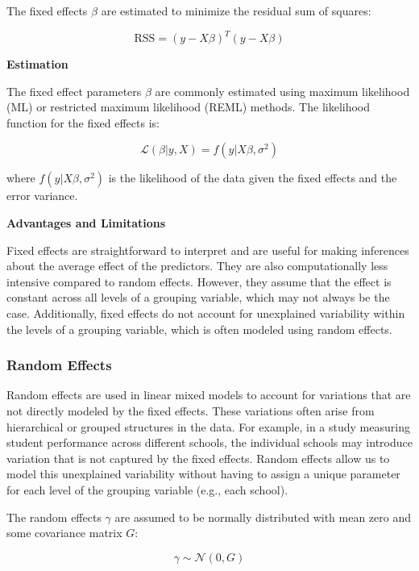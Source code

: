 \documentclass[12pt, twoside,hidelinks]{article}
\theoremstyle{definition}
\numberwithin{equation}{section}
\begin{document}
The fixed effects \( \beta \) are estimated to minimize the residual sum of squares:

\[
\text{RSS} = (y - X\beta)^T(y - X\beta)
\]

\textbf{Estimation}
\newline

The fixed effect parameters \( \beta \) are commonly estimated using maximum likelihood (ML) or restricted maximum likelihood (REML) methods. The likelihood function for the fixed effects is:

\[
\mathcal{L}(\beta | y, X) = f(y | X\beta, \sigma^2)
\]

where \( f(y | X\beta, \sigma^2) \) is the likelihood of the data given the fixed effects and the error variance.
\newline

\textbf{Advantages and Limitations}
\newline

Fixed effects are straightforward to interpret and are useful for making inferences about the average effect of the predictors. They are also computationally less intensive compared to random effects. However, they assume that the effect is constant across all levels of a grouping variable, which may not always be the case. Additionally, fixed effects do not account for unexplained variability within the levels of a grouping variable, which is often modeled using random effects.


\subsubsection{Random Effects}

Random effects are used in linear mixed models to account for variations that are not directly modeled by the fixed effects. These variations often arise from hierarchical or grouped structures in the data. For example, in a study measuring student performance across different schools, the individual schools may introduce variation that is not captured by the fixed effects. Random effects allow us to model this unexplained variability without having to assign a unique parameter for each level of the grouping variable (e.g., each school).
\newline

The random effects \( \gamma \) are assumed to be normally distributed with mean zero and some covariance matrix \( G \):

\[
\gamma \sim \mathcal{N}(0, G)
\]
\newline
\end{document}
